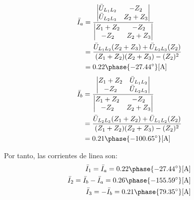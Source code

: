 \documentclass[letter,11pt]{article}
\begin{document}
\begin{enumerate}
\begin{equation*}
    \begin{split}
        \bar{I}_a &= \dfrac{\begin{vmatrix}
                        \bar{U}_{L_1L_2} & -Z_2\\
                        \bar{U}_{L_2L_3} & Z_2+Z_3\\
                     \end{vmatrix}}{\begin{vmatrix}
                        Z_1+Z_2 & -Z_2\\
                        -Z_2    & Z_2+Z_3\\
                     \end{vmatrix}}\\
                  &= \dfrac{\bar{U}_{L_1L_2}(Z_2+Z_3)+\bar{U}_{L_2L_3}(Z_2)}
                     {(Z_1+Z_2)(Z_2+Z_3)-(Z_2)^2}\\
                  &= 0.22\phase{-27.44^{\circ}}[\text{A}]\\
    \end{split}
\end{equation*}
\begin{equation*}
    \begin{split}
        \bar{I}_b &= \dfrac{\begin{vmatrix}
                        Z_1+Z_2 & \bar{U}_{L_1L_2}\\
                        -Z_2    & \bar{U}_{L_2L_3}\\
                     \end{vmatrix}}{\begin{vmatrix}
                        Z_1+Z_2 & -Z_2\\
                        -Z_2    & Z_2+Z_3\\
                     \end{vmatrix}}\\
                  &= \dfrac{\bar{U}_{L_2L_3}(Z_1+Z_2)+\bar{U}_{L_1L_2}(Z_2)}
                     {(Z_1+Z_2)(Z_2+Z_3)-(Z_2)^2}\\
                  &= 0.21\phase{-100.65^{\circ}}[\text{A}]\\
    \end{split}
\end{equation*}

Por tanto, las corrientes de linea son:
\begin{equation*}
    \begin{split}
        \bar{I}_1 = \bar{I}_a = 0.22\phase{-27.44^{\circ}}[\text{A}]\\
        \bar{I}_2 = \bar{I}_b-\bar{I}_a = 0.26\phase{-155.59^{\circ}}[\text{A}]\\
        \bar{I}_3 = -\bar{I}_b = 0.21\phase{79.35^{\circ}}[\text{A}]\\
    \end{split}
\end{equation*}


\end{enumerate}
\end{document}
